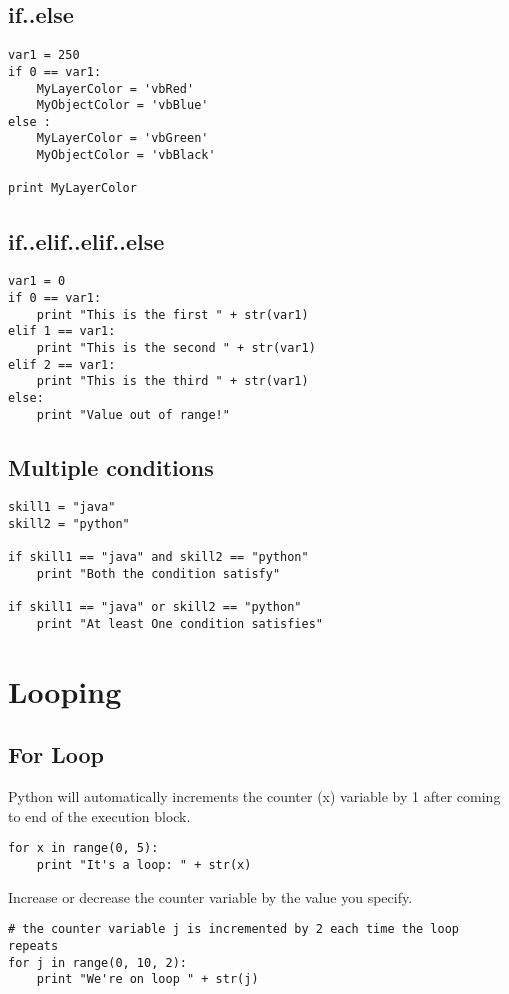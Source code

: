\documentclass[a4paper,9pt]{extarticle}
\begin{document}
\begin{multicols*}{2}
\subsection{if..else}
\begin{lstlisting}
var1 = 250
if 0 == var1:
    MyLayerColor = 'vbRed'
    MyObjectColor = 'vbBlue'
else :
    MyLayerColor = 'vbGreen'
    MyObjectColor = 'vbBlack'

print MyLayerColor
\end{lstlisting}

\subsection{if..elif..elif..else}
\begin{lstlisting}
var1 = 0
if 0 == var1:
    print "This is the first " + str(var1)
elif 1 == var1:
    print "This is the second " + str(var1)
elif 2 == var1:
    print "This is the third " + str(var1)
else:
    print "Value out of range!"
\end{lstlisting}

\subsection{Multiple conditions}
\begin{lstlisting}
skill1 = "java"
skill2 = "python"

if skill1 == "java" and skill2 == "python"
    print "Both the condition satisfy"

if skill1 == "java" or skill2 == "python"
    print "At least One condition satisfies"

\end{lstlisting}


\section{Looping}

\subsection{For Loop}
Python will automatically increments the counter (x) variable by 1 after coming to end of the execution block.
\begin{lstlisting}
for x in range(0, 5):
    print "It's a loop: " + str(x)
\end{lstlisting}

Increase or decrease the counter variable by the value you specify.
\begin{lstlisting}
# the counter variable j is incremented by 2 each time the loop repeats
for j in range(0, 10, 2):
    print "We're on loop " + str(j)


\end{lstlisting}
\end{multicols*}
\end{document}
